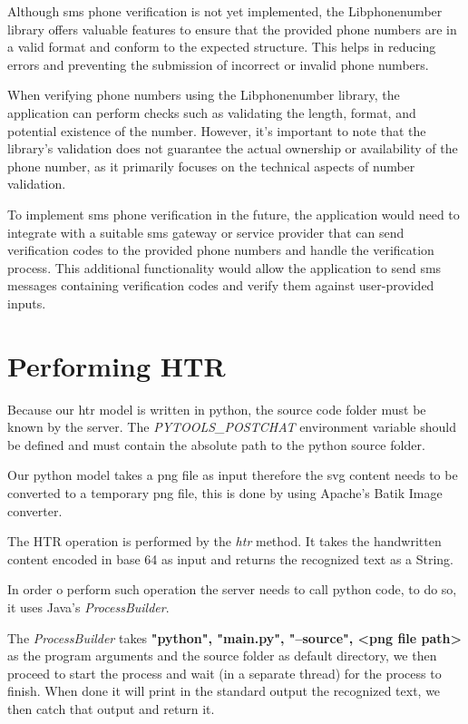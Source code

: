 Although \gls{sms} phone verification is not yet implemented, the Libphonenumber library offers valuable features to ensure that the provided phone numbers are in a valid format and conform to the expected structure. This helps in reducing errors and preventing the submission of incorrect or invalid phone numbers.

When verifying phone numbers using the Libphonenumber library, the application can perform checks such as validating the length, format, and potential existence of the number. However, it's important to note that the library's validation does not guarantee the actual ownership or availability of the phone number, as it primarily focuses on the technical aspects of number validation.

To implement \gls{sms} phone verification in the future, the application would need to integrate with a suitable \gls{sms} gateway or service provider that can send verification codes to the provided phone numbers and handle the verification process. This additional functionality would allow the application to send \gls{sms} messages containing verification codes and verify them against user-provided inputs.


\section{Performing HTR}

\noindent

Because our \gls{htr} model is written in python, the source code folder must be known by the server. The \textit{PYTOOLS\_POSTCHAT} environment variable should be defined and must contain the absolute path to the python source folder.

Our python model takes a \gls{png} file as input therefore the \gls{svg} content needs to be converted to a temporary \gls{png} file, this is done by using Apache's Batik Image converter.

The HTR operation is performed by the \textit{htr} method. It takes the handwritten content encoded in base 64 as input and returns the recognized text as a String.

In order o perform such operation the server needs to call python code, to do so, it uses Java's \textit{ProcessBuilder}. 

The \textit{ProcessBuilder} takes \textbf{"python", "main.py", "--source", <png file path>} as the program arguments and the source folder as default directory, we then proceed to start the process and wait (in a separate thread) for the process to finish. When done it will print in the standard output the recognized text, we then catch that output and return it.
